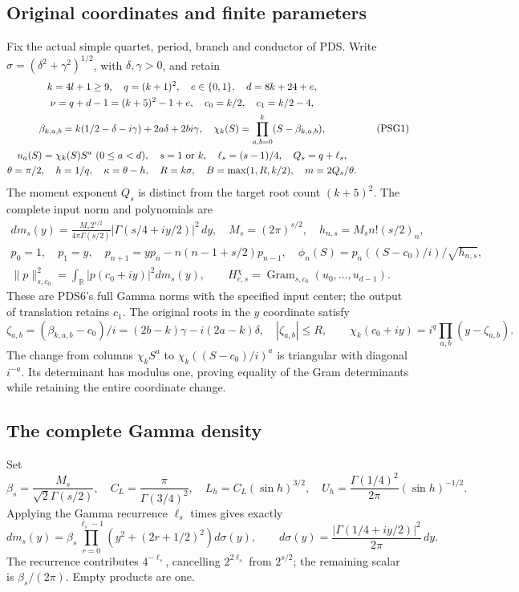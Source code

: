 \documentclass[10pt]{article}
\begin{document}
\subsection{Original coordinates and finite parameters}
Fix the actual simple quartet, period, branch and conductor of PDS.
Write \(\sigma=(\delta^2+\gamma^2)^{1/2}\), with \(\delta,\gamma>0\), and retain
\[
\begin{gathered}
 k=4l+1\ge9,\quad q=(k+1)^2,\quad e\in\{0,1\},\quad d=8k+24+e,\\
 \nu=q+d-1=(k+5)^2-1+e,\quad c_0=k/2,\quad c_1=k/2-4,\\
 \beta_{k,a,b}=k(1/2-\delta-i\gamma)+2a\delta+2bi\gamma,\quad
 \chi_k(S)=\prod_{a,b=0}^k(S-\beta_{k,a,b}),\\
 u_a(S)=\chi_k(S)S^a\ (0\le a<d),\quad
 s=1\ \hbox{or}\ k,\quad \ell_s=(s-1)/4,\quad Q_s=q+\ell_s,\\
 \theta=\pi/2,\quad h=1/q,\quad \kappa=\theta-h,\quad
 R=k\sigma,\quad B=\max(1,R,k/2),\quad m=2Q_s/\theta .
\end{gathered}\tag{PSG1}
\]
The moment exponent \(Q_s\) is distinct from the target root count
\((k+5)^2\). The complete input norm and polynomials are
\[
\begin{gathered}
 dm_s(y)=\frac{M_s2^{s/2}}{4\pi\Gamma(s/2)}
          |\Gamma(s/4+iy/2)|^2\,dy,\quad
 M_s=(2\pi)^{s/2},\quad h_{n,s}=M_s n!(s/2)_n,\\
 p_0=1,\quad p_1=y,\quad
 p_{n+1}=yp_n-n(n-1+s/2)p_{n-1},\quad
 \phi_n(S)=p_n((S-c_0)/i)/\sqrt{h_{n,s}},\\
 \|p\|_{s,c_0}^2=\int_{\mathbb R}|p(c_0+iy)|^2dm_s(y),\qquad
 H^\chi_{e,s}=\operatorname{Gram}_{s,c_0}(u_0,\ldots,u_{d-1}).
\end{gathered}\tag{PSG2}
\]
These are PDS6's full Gamma norms with the specified input center;
the output of translation retains \(c_1\). The original roots in the
\(y\) coordinate satisfy
\[
 \zeta_{a,b}=(\beta_{k,a,b}-c_0)/i
       =(2b-k)\gamma-i(2a-k)\delta,\quad |\zeta_{a,b}|\le R,\qquad
 \chi_k(c_0+iy)=i^q\prod_{a,b}(y-\zeta_{a,b}).
 \tag{PSG3}
\]
The change from columns \(\chi_k S^a\) to
\(\chi_k((S-c_0)/i)^a\) is triangular with diagonal \(i^{-a}\).
Its determinant has modulus one, proving equality of the Gram
determinants while retaining the entire coordinate change.

\subsection{The complete Gamma density}
Set
\[
 \beta_s=\frac{M_s}{\sqrt2\Gamma(s/2)},\quad
 C_L=\frac{\pi}{\Gamma(3/4)^2},\quad
 L_h=C_L(\sin h)^{3/2},\quad
 U_h=\frac{\Gamma(1/4)^2}{2\pi}(\sin h)^{-1/2}.
 \tag{PSG4}
\]
Applying the Gamma recurrence \(\ell_s\) times gives exactly
\[
 dm_s(y)=\beta_s\prod_{r=0}^{\ell_s-1}(y^2+(2r+1/2)^2)d\sigma(y),
 \qquad d\sigma(y)=\frac{|\Gamma(1/4+iy/2)|^2}{2\pi}\,dy .
 \tag{PSG5}
\]
The recurrence contributes \(4^{-\ell_s}\), cancelling \(2^{2\ell_s}\)
from \(2^{s/2}\); the remaining scalar is \(\beta_s/(2\pi)\).
Empty products are one.
\end{document}
